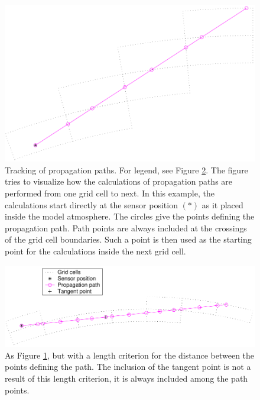 \begin{figure}
 \begin{center}
  \includegraphics*[width=0.80\hsize]{ppath_ex1}
  \caption{Tracking of propagation paths. For legend, see 
    Figure \ref{fig:ppath:ex2}. The figure tries to visualize how the
    calculations of propagation paths are performed from one grid cell
    to next. In this example, the calculations start directly at the
    sensor position $(\ast)$ as it placed inside the model
    atmosphere. The circles give the points defining the propagation
    path. Path points are always included at the crossings of the grid
    cell boundaries. Such a point is then used as the starting point
    for the calculations inside the next grid cell. }
  \label{fig:ppath:ex1}  
 \end{center}
\end{figure}

\begin{figure}
 \begin{center}
   \includegraphics*[width=0.98\hsize]{ppath_ex2}
  \caption{As Figure \ref{fig:ppath:ex1}, but with a length criterion 
    for the distance between the points defining the path.
    The inclusion of the tangent point is not a result of this length
    criterion, it is always included among the path points.}
  \label{fig:ppath:ex2}  
 \end{center}
\end{figure}


